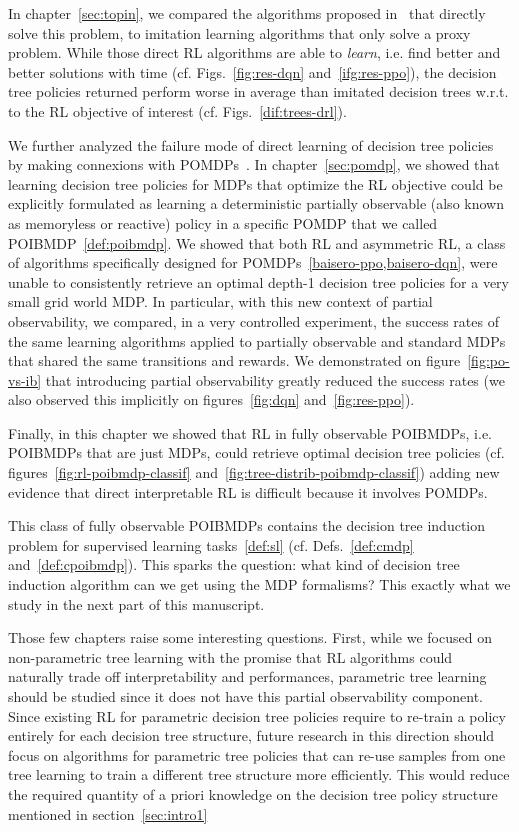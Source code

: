 In chapter~\ref{sec:topin}, we compared the algorithms proposed in~\cite{topin2021iterative} that directly solve this problem, to imitation learning algorithms that only solve a proxy problem.
While those direct RL algorithms are able to \textit{learn}, i.e. find better and better solutions with time (cf. Figs.~\ref{fig:res-dqn} and~\ref{ifg:res-ppo}), the decision tree policies returned perform worse in average than imitated decision trees w.r.t. to the RL objective of interest (cf. Figs.~\ref{dif:trees-drl}).

We further analyzed the failure mode of direct learning of decision tree policies by making connexions with POMDPs~\cite{POMDP,chap2}.
In chapter~\ref{sec:pomdp}, we showed that learning decision tree policies for MDPs that optimize the RL objective could be explicitly formulated as learning a deterministic partially observable (also known as memoryless or reactive) policy in a specific POMDP that we called POIBMDP~\ref{def:poibmdp}.
We showed that both RL and asymmetric RL, a class of algorithms specifically designed for POMDPs~\ref{baisero-ppo,baisero-dqn}, were unable to consistently retrieve an optimal depth-1 decision tree policies for a very small grid world MDP.
In particular, with this new context of partial observability, we compared, in a very controlled experiment, the success rates of the same learning algorithms applied to partially observable and standard MDPs that shared the same transitions and rewards.
We demonstrated on figure~\ref{fig:po-vs-ib} that introducing partial observability greatly reduced the success rates (we also observed this implicitly on figures~\ref{fig:dqn} and~\ref{fig:res-ppo}).  

Finally, in this chapter we showed that RL in fully observable POIBMDPs, i.e. POIBMDPs that are just MDPs, could retrieve optimal decision tree policies (cf. figures~\ref{fig:rl-poibmdp-classif} and~\ref{fig:tree-distrib-poibmdp-classif}) adding new evidence that direct interpretable RL is difficult because it involves POMDPs.

This class of fully observable POIBMDPs contains the decision tree induction problem for supervised learning tasks~\ref{def:sl} (cf. Defs.~\ref{def:cmdp} and~\ref{def:cpoibmdp}).
This sparks the question: what kind of decision tree induction algorithm can we get using the MDP formalisms?
This exactly what we study in the next part of this manuscript.

Those few chapters raise some interesting questions.
First, while we focused on non-parametric tree learning with the promise that RL algorithms could naturally trade off interpretability and performances, parametric tree learning should be studied since it does not have this partial observability component.
Since existing RL for parametric decision tree policies \cite{silva,vos2024optimizinginterpretabledecisiontree,sympol} require to re-train a policy entirely for each decision tree structure, future research in this direction should focus on algorithms for parametric tree policies that can re-use samples from one tree learning to train a different tree structure more efficiently.
This would reduce the required quantity of a priori knowledge on the decision tree policy structure mentioned in section~\ref{sec:intro1}

